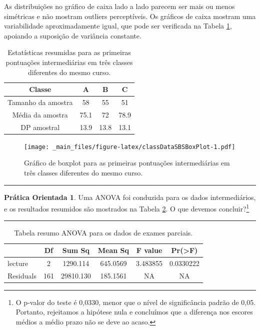 \documentclass[
]{book}
\theoremstyle{definition}
\theoremstyle{definition}
\theoremstyle{definition}
\newtheorem{exercise}{Prática Orientada}[chapter]
\theoremstyle{definition}
\theoremstyle{remark}
\begin{document}
As distribuições no gráfico de caixa lado a lado parecem ser mais ou menos simétricas e não mostram outliers perceptíveis. Os gráficos de caixa mostram uma variabilidade aproximadamente igual, que pode ser verificada na Tabela \ref{tab:summaryStatisticsForClassTestData}, apoiando a suposição de variância constante.

\begin{table}

\caption{\label{tab:summaryStatisticsForClassTestData}Estatísticas resumidas para as primeiras pontuações intermediárias em três classes diferentes do mesmo curso.}
\centering
\begin{tabular}[t]{c|c|c|c}
\hline
Classe & A & B & C\\
\hline
Tamanho da amostra & 58 & 55 & 51\\
\hline
Média da amostra & 75.1 & 72 & 78.9\\
\hline
DP amostral & 13.9 & 13.8 & 13.1\\
\hline
\end{tabular}
\end{table}

\begin{figure}
\centering
\texttt{[image: \_main\_files/figure-latex/classDataSBSBoxPlot-1.pdf]}
\caption{\label{fig:classDataSBSBoxPlot}Gráfico de boxplot para as primeiras pontuações intermediárias em três classes diferentes do mesmo curso.}
\end{figure}

\begin{center}\rule{0.5\linewidth}{0.5pt}\end{center}

\begin{exercise}
\protect\hypertarget{exr:exerExaminingAnovaSummaryTableForMidtermData}{}{\label{exr:exerExaminingAnovaSummaryTableForMidtermData} }Uma ANOVA foi conduzida para os dados intermediários, e os resultados resumidos são mostrados na Tabela \ref{tab:anovaSummaryTableForMidtermData}. O que devemos concluir?\footnote{O p-valor do teste é 0,0330, menor que o nível de significância padrão de 0,05. Portanto, rejeitamos a hipótese nula e concluímos que a diferença nos escores médios a médio prazo não se deve ao acaso.}
\end{exercise}

\begin{center}\rule{0.5\linewidth}{0.5pt}\end{center}

\begin{table}

\caption{\label{tab:anovaSummaryTableForMidtermData}Tabela resumo ANOVA para os dados de exames parciais.}
\centering
\begin{tabular}[t]{l|c|c|c|c|c}
\hline
  & Df & Sum Sq & Mean Sq & F value & Pr(>F)\\
\hline
lecture & 2 & 1290.114 & 645.0569 & 3.483855 & 0.0330222\\
\hline
Residuals & 161 & 29810.130 & 185.1561 & NA & NA\\
\hline
\end{tabular}
\end{table}
\end{document}
